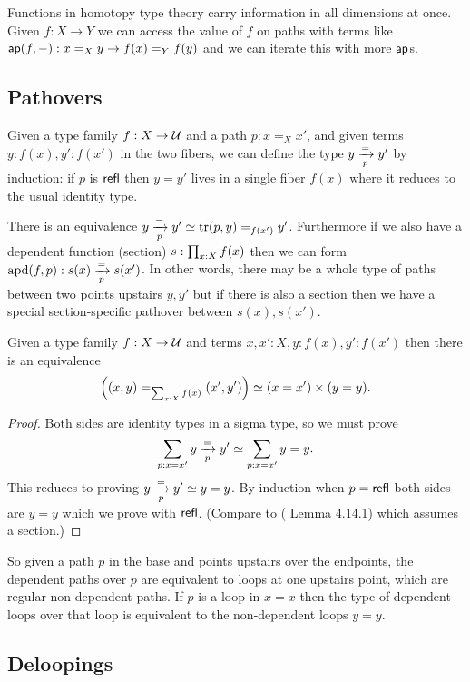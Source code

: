 \documentclass[12pt]{article}
\begin{document}
Functions in homotopy type theory carry information in all dimensions at once. Given \( f:X\to Y \) we can access the value of \( f \) on paths with terms like \( \textsf{ap}(f,-):x=_Xy\to f(x)=_Y f(y) \) and we can iterate this with more \( \textsf{ap} \)s. 

\subsection{Pathovers}
Given a type family \( f:X\to \mathcal{U} \) and a path \( p:x=_X x' \), and given terms \( y:f(x), y':f(x') \) in the two fibers, we can define the type \( y\xrightarrow[{p}]{=}y' \) by induction: if \( p \) is \( \textsf{refl} \) then \( y=y' \) lives in a single fiber \( f(x) \) where it reduces to the usual identity type.

There is an equivalence \( y\xrightarrow[{p}]{=}y'\simeq \mathrm{tr}(p,y)=_{f(x')}y' \). Furthermore if we also have a dependent function (section) \( s:\prod_{x:X} f(x) \) then we can form \( \mathrm{apd}(f,p):s(x)\xrightarrow[{p}]{=}s(x') \). In other words, there may be a whole type of paths between two points upstairs \( y, y' \) but if there is also a section then we have a special section-specific pathover between \( s(x), s(x') \).

\begin{mylemma}
Given a type family \( f:X\to\mathcal{U} \) and terms \( x,x':X, y:f(x), y':f(x') \) then there is an equivalence 
\[ 
  \left((x,y) =_{\sum_{x:X}f(x)} (x',y')\right) \simeq 
  (x=x')\times (y=y).
\]
\end{mylemma}
\begin{proof}
Both sides are identity types in a sigma type, so we must prove
\[ 
\sum_{p:x=x'}y\xrightarrow[{p}]{=}y' \simeq \sum_{p:x=x'}y=y.
\] 
This reduces to proving \( y\xrightarrow[{p}]{=}y'\simeq y=y  \). By induction when \( p=\textsf{refl} \) both sides are \( y=y \) which we prove with \( \textsf{refl} \). (Compare to (\cite{Symmetry} Lemma 4.14.1) which assumes a section.)
\end{proof}

So given a path \( p \) in the base and points upstairs over the endpoints, the dependent paths over \( p \) are equivalent to loops at one upstairs point, which are regular non-dependent paths. If \( p \) is a loop in \( x=x \) then the type of dependent loops over that loop is equivalent to the non-dependent loops \( y=y \).

\subsection{Deloopings}
\end{document}
